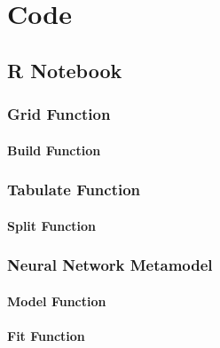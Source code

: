 
\appendix

\doublespacing

\chapter{Code}

\section{R Notebook}
\label{sec:notebook}

\pagebreak

\subsection{Grid Function}
\label{sec:grid}

\pagebreak

\subsubsection{Build Function}
\label{sec:build}

\pagebreak

\subsection{Tabulate Function}
\label{sec:tabulate}

\pagebreak

\subsubsection{Split Function}
\label{sec:split}

\pagebreak

\subsection{Neural Network Metamodel}
\label{sec:nn}

\pagebreak

\subsubsection{Model Function}
\label{sec:model}

\pagebreak

\subsubsection{Fit Function}
\label{sec:fit}

\pagebreak

